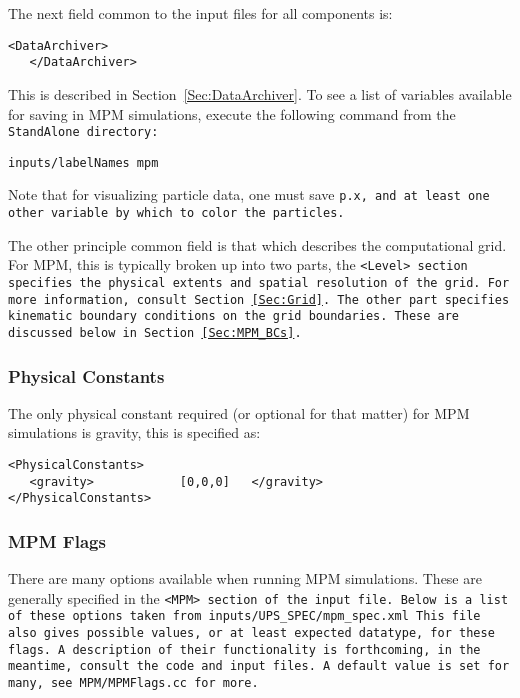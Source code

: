 The next field common to the input files for all components is:

\begin{Verbatim}[fontsize=\footnotesize]
   <DataArchiver>
   </DataArchiver>
\end{Verbatim}
This is described in Section~\ref{Sec:DataArchiver}.  To see a list of
variables available for saving in MPM simulations, execute the following
command from the \tt StandAlone \normalfont directory:

\begin{Verbatim}[fontsize=\footnotesize]
inputs/labelNames mpm
\end{Verbatim}
Note that for visualizing particle data, one must save \tt p.x, \normalfont
and at least one other variable by which to color the particles.

The other principle common field is that which describes the computational
grid.  For MPM, this is typically broken up into two parts, the
\tt <Level> \normalfont section specifies the physical extents and spatial
resolution of the grid.  For more information, consult Section~\ref{Sec:Grid}.
The other part specifies kinematic boundary conditions on the grid boundaries.
These are discussed below in Section~\ref{Sec:MPM_BCs}.

\subsubsection{Physical Constants}
The only physical constant required (or optional for that matter) for
MPM simulations is gravity, this is specified as:

\begin{Verbatim}[fontsize=\footnotesize]
<PhysicalConstants>
   <gravity>            [0,0,0]   </gravity>
</PhysicalConstants>
\end{Verbatim}

\subsubsection{MPM Flags} \label{MPMFlags}

There are many options available when running MPM simulations.  These
are generally specified in the \tt <MPM> \normalfont section of the input file.
Below is a list of these options taken from
\tt inputs/UPS\_SPEC/mpm\_spec.xml \normalfont 
This file also gives possible values, or at least expected datatype,
for these flags.  A description of their functionality is forthcoming,
in the meantime, consult the code and input files.  A default value is
set for many, see \tt MPM/MPMFlags.cc \normalfont for more.

